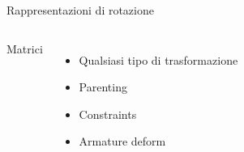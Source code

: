 \documentclass[10pt]{beamer}
\begin{document}
\begin{frame}{Rappresentazioni di rotazione}
\begin{columns}[T,onlytextwidth]
    \alert<3>{Matrici}																			%
      \begin{itemize}						%
				\item Qualsiasi tipo di trasformazione	%
				\item Parenting				%
        \item Constraints			%
				\item Armature deform	%
      \end{itemize}
  \end{columns}
\end{frame}
\end{document}
